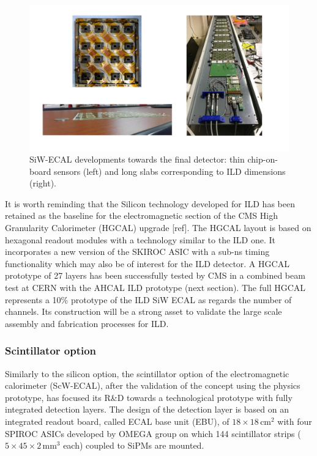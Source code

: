 \begin{figure}[t!]
\centering
\includegraphics[width=1.0\hsize]{Detector/fig/SiWECAL_dev.jpg}
\caption{SiW-ECAL developments towards the final detector: thin chip-on-board sensors (left) and long slabs corresponding to ILD dimensions (right).}
\label{fig:det:SiWECAL_dev}
\end{figure}

It is worth reminding that the Silicon technology developed for ILD has been retained as the baseline for the electromagnetic section of the CMS High Granularity Calorimeter (HGCAL) upgrade [ref]. The HGCAL layout is based on hexagonal readout modules with a technology similar to the ILD one. It incorporates a new version of the SKIROC ASIC with a sub-ns timing functionality which may also be of interest for the ILD detector. A HGCAL prototype of 27 layers has been successfully tested by CMS in a combined beam test at CERN with the AHCAL ILD prototype (next section). The full HGCAL represents a 10\% prototype of the ILD SiW ECAL as regards the number of channels. Its construction will be a strong asset to validate the large scale assembly and fabrication processes for ILD. 


\subsubsection{Scintillator option}

Similarly to the silicon option, the scintillator option of the electromagnetic calorimeter (ScW-ECAL),
after the validation of the concept using the physics prototype,
has focused its R\&D towards a technological prototype 
with fully integrated detection layers. 
The design of the detection layer is based on an integrated readout board, 
called ECAL base unit (EBU), of $18\times18\,\mathrm{cm}^2$ 
with four SPIROC ASICs developed by OMEGA group\cite{ild:bib:spiroc} on which 144 scintillator strips 
($5\times45\times2\,\mathrm{mm^3}$ each) coupled to SiPMs are mounted.

